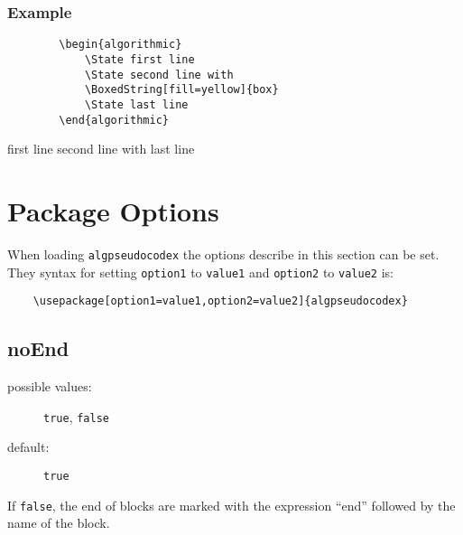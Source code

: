 \documentclass[11pt,a4paper,USenglish]{article}
\begin{document}
\subsubsection*{Example}
\begin{minipage}[t]{0.45\textwidth}
	\begin{verbatim}
		\begin{algorithmic}
		    \State first line
		    \State second line with
		    \BoxedString[fill=yellow]{box}
		    \State last line
		\end{algorithmic}
	\end{verbatim}
\end{minipage}
\hfill
\begin{minipage}[t]{0.45\textwidth}
	\begin{algorithmic}
		\State first line
		\State second line with
		\State last line
	\end{algorithmic}
\end{minipage}


\section{Package Options}
When loading \texttt{algpseudocodex} the options describe in this section can be set. They syntax for setting \verb|option1| to \verb|value1| and \verb|option2| to \verb|value2| is:
\begin{verbatim}
	\usepackage[option1=value1,option2=value2]{algpseudocodex}
\end{verbatim}

\subsection{noEnd}
\begin{description}
	\item[possible values:] \verb|true|, \verb|false|
	\item[default:] \verb|true|
\end{description}
If \verb|false|, the end of blocks are marked with the expression ``end'' followed by the name of the block.
\end{document}

